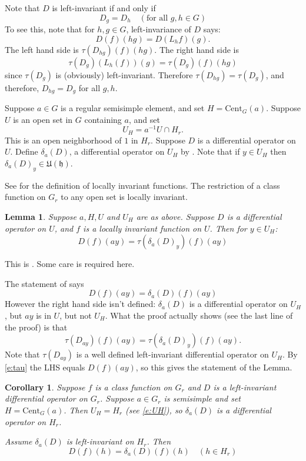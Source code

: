 \documentclass{article}
\newtheorem{lem}[thm]{Lemma}
\newtheorem{cor}[thm]{Corollary}
\theoremstyle{definition}
\numberwithin{equation}{section}
\renewcommand{\-}{\hyp{}}
\newcommand{\inv}{^{-1}}
\newcommand{\U}{\mathfrak U}
\newcommand{\h}{\mathfrak h}
\newcommand{\Cent}{\mathrm{Cent}}
\begin{document}
Note that $D$ is left-invariant if and only if
\begin{equation}
  \label{e:left}
  D_g=D_h\quad(\text{for all }g,h\in G)
\end{equation}
To see this, note that for $h,g\in G$, left-invariance of $D$ says:
$$
D(f)(hg)=D(L_hf)(g).
$$
The left hand side is $\tau(D_{hg})(f)(hg)$. The right hand side is
$$
\tau(D_g)(L_h(f))(g)=\tau(D_g)(f)(hg)
$$
since $\tau(D_g)$ is (obviously)  left-invariant. Therefore $\tau(D_{hg})=\tau(D_g)$, and therefore, $D_{hg}=D_g$ for all $g,h$.


Suppose $a\in G$ is a regular semisimple element, and set $H=\Cent_G(a)$. Suppose $U$ is an open set in $G$ containing $a$, 
and set
\begin{equation}
  \label{e:UH}
U_H=a\inv U\cap H_r.
\end{equation}
This is an open neighborhood of $1$ in $H_r$.
Suppose $D$ is a differential operator on $U$. Define $\delta_a(D)$, a differential operator  on $U_H$ by \cite[Section 4]{HC_inv_eigen}.
Note that if $y\in U_H$ then $\delta_a(D)_y\in \U(\h)$. 

See \cite[Section 8]{HC_inv_dist} for the definition of locally invariant functions.
The restriction of a class function on $G_r$ to any open set is locally invariant.

\begin{lem}
\label{l:1}
Suppose $a,H,U$ and $U_H$ are as above. 
Suppose $D$ is a differential operator on $U$, and $f$ is a locally invariant function on $U$.
Then for $y\in U_H$:
$$
D(f)(ay)=\tau(\delta_a(D)_y)(f)(ay)
$$
\end{lem}

This is \cite[Lemma 18]{HC_inv_eigen}. Some care is required here.

The statement of \cite[Lemma 18]{HC_inv_eigen} says
$$
D(f)(ay)=\delta_a(D)(f)(ay)
$$
However the right hand side isn't defined: $\delta_a(D)$ is a differential operator on $U_H$, but $ay$ is in $U$, but not $U_H$.
What the proof actually shows (see the last line of the proof) is that 
$$
\tau(D_{ay})(f)(ay)=\tau(\delta_a(D)_y)(f)(ay).
$$
Note that $\tau(D_{ay})$ is a well defined left-invariant differential operator on $U_H$.
By \eqref{e:tau}
the LHS equals $D(f)(ay)$, so this gives the statement of the Lemma.

\begin{cor}
  Suppose $f$ is a class function on $G_r$ and $D$ is a left-invariant differential operator on $G_r$.
  Suppose $a\in G_r$ is semisimple and set $H=\Cent_G(a)$. Then $U_H=H_r$ (see \eqref{e:UH}), so $\delta_a(D)$
  is a  differential operator on $H_r$.

  Assume $\delta_a(D)$ is left-invariant on $H_r$. Then
  $$
  D(f)(h)=\delta_a(D)(f)(h)\quad (h\in H_r)
  $$
\end{cor}
\end{document}
